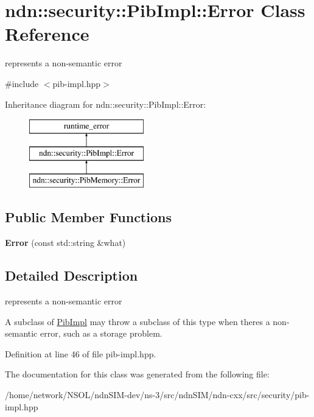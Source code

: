 \hypertarget{classndn_1_1security_1_1PibImpl_1_1Error}{}\section{ndn\+:\+:security\+:\+:Pib\+Impl\+:\+:Error Class Reference}
\label{classndn_1_1security_1_1PibImpl_1_1Error}


represents a non-\/semantic error  




{\ttfamily \#include $<$pib-\/impl.\+hpp$>$}

Inheritance diagram for ndn\+:\+:security\+:\+:Pib\+Impl\+:\+:Error\+:\begin{figure}[H]
\begin{center}
\leavevmode
\includegraphics[height=3.000000cm]{classndn_1_1security_1_1PibImpl_1_1Error}
\end{center}
\end{figure}
\subsection*{Public Member Functions}
\begin{DoxyCompactItemize}
\item 
{\bfseries Error} (const std\+::string \&what)\hypertarget{classndn_1_1security_1_1PibImpl_1_1Error_adb527a2461c374c0cb0d852abfd6f805}{}\label{classndn_1_1security_1_1PibImpl_1_1Error_adb527a2461c374c0cb0d852abfd6f805}

\end{DoxyCompactItemize}


\subsection{Detailed Description}
represents a non-\/semantic error 

A subclass of \hyperlink{classndn_1_1security_1_1PibImpl}{Pib\+Impl} may throw a subclass of this type when there\textquotesingle{}s a non-\/semantic error, such as a storage problem. 

Definition at line 46 of file pib-\/impl.\+hpp.



The documentation for this class was generated from the following file\+:\begin{DoxyCompactItemize}
\item 
/home/network/\+N\+S\+O\+L/ndn\+S\+I\+M-\/dev/ns-\/3/src/ndn\+S\+I\+M/ndn-\/cxx/src/security/pib-\/impl.\+hpp\end{DoxyCompactItemize}
